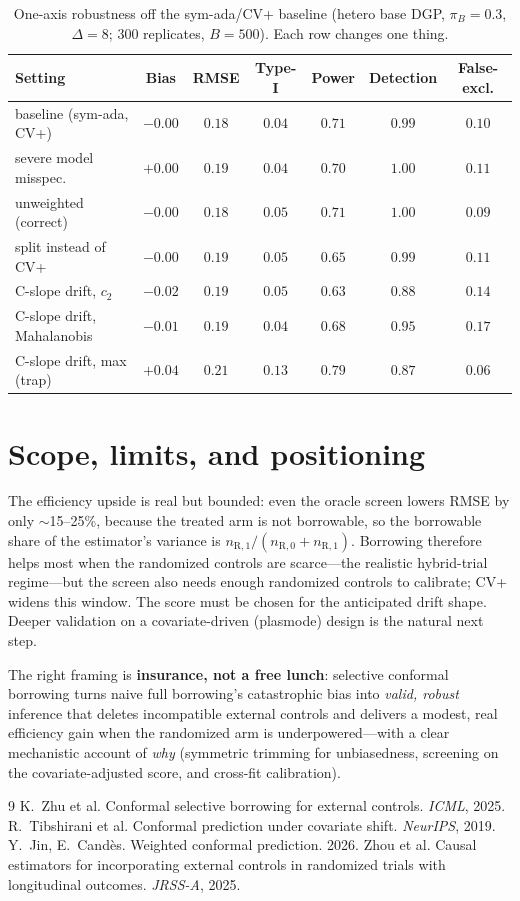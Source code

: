 \documentclass[11pt]{article}
\newcommand{\R}{\mathrm{R}}
\begin{document}
\begin{table}[ht]\centering
\caption{One-axis robustness off the sym-ada/CV+ baseline (hetero base DGP, $\pi_B{=}0.3$, $\Delta{=}8$; $300$ replicates, $B{=}500$). Each row changes one thing.}
\label{tab:robust}
\begin{tabular}{lcccccc}
\toprule
Setting & Bias & RMSE & Type-I & Power & Detection & False-excl. \\
\midrule
baseline (sym-ada, CV+) & $-0.00$ & $0.18$ & $0.04$ & $0.71$ & $0.99$ & $0.10$ \\
severe model misspec.\  & $+0.00$ & $0.19$ & $0.04$ & $0.70$ & $1.00$ & $0.11$ \\
unweighted (correct)    & $-0.00$ & $0.18$ & $0.05$ & $0.71$ & $1.00$ & $0.09$ \\
split instead of CV+    & $-0.00$ & $0.19$ & $0.05$ & $0.65$ & $0.99$ & $0.11$ \\
C-slope drift, $c_2$    & $-0.02$ & $0.19$ & $0.05$ & $0.63$ & $0.88$ & $0.14$ \\
C-slope drift, Mahalanobis & $-0.01$ & $0.19$ & $0.04$ & $0.68$ & $0.95$ & $0.17$ \\
C-slope drift, max (trap)  & $+0.04$ & $0.21$ & $0.13$ & $0.79$ & $0.87$ & $0.06$ \\
\bottomrule
\end{tabular}
\end{table}

\section{Scope, limits, and positioning}
The efficiency upside is real but bounded: even the oracle screen lowers RMSE by only $\sim$15--25\%, because the treated arm is not borrowable, so the borrowable share of the estimator's variance is $n_{\R,1}/(n_{\R,0}+n_{\R,1})$. Borrowing therefore helps most when the randomized controls are scarce---the realistic hybrid-trial regime---but the screen also needs enough randomized controls to calibrate; CV+ widens this window. The score must be chosen for the anticipated drift shape. Deeper validation on a covariate-driven (plasmode) design is the natural next step.

The right framing is \textbf{insurance, not a free lunch}: selective conformal borrowing turns naive full borrowing's catastrophic bias into \emph{valid, robust} inference that deletes incompatible external controls and delivers a modest, real efficiency gain when the randomized arm is underpowered---with a clear mechanistic account of \emph{why} (symmetric trimming for unbiasedness, screening on the covariate-adjusted score, and cross-fit calibration).

\begin{thebibliography}{9}\small
{} K.~Zhu et al. Conformal selective borrowing for external controls. \emph{ICML}, 2025.
 R.~Tibshirani et al. Conformal prediction under covariate shift. \emph{NeurIPS}, 2019.
 Y.~Jin, E.~Cand\`es. Weighted conformal prediction. 2026.
 Zhou et al. Causal estimators for incorporating external controls in randomized trials with longitudinal outcomes. \emph{JRSS-A}, 2025.
\end{thebibliography}
\end{document}
